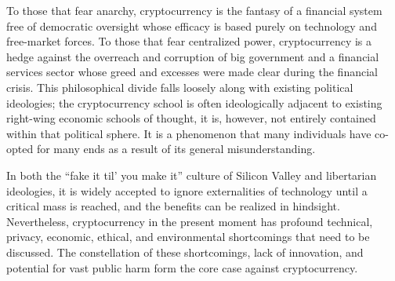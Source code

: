 To those that fear anarchy, cryptocurrency is the fantasy of a financial system
free of democratic oversight whose efficacy is based purely on technology and
free-market forces. To those that fear centralized power, cryptocurrency is a
hedge against the overreach and corruption of big government and a financial
services sector whose greed and excesses were made clear during the financial
crisis. This philosophical divide falls loosely along with existing political
ideologies; the cryptocurrency school is often ideologically adjacent to
existing right-wing economic schools of thought, it is, however, not entirely
contained within that political sphere. It is a phenomenon that many individuals
have co-opted for many ends as a result of its general misunderstanding.

In both the ``fake it til' you make it'' culture of Silicon Valley and
libertarian ideologies, it is widely accepted to ignore externalities of
technology until a critical mass is reached, and the benefits can be realized in
hindsight.  Nevertheless, cryptocurrency in the present moment has profound
technical, privacy, economic, ethical, and environmental shortcomings that need
to be discussed. The constellation of these shortcomings, lack of innovation,
and potential for vast public harm form the core case against cryptocurrency.

